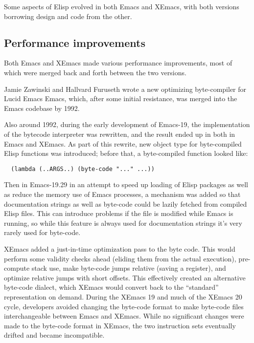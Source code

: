 \documentclass[format=acmsmall, review=false, screen=true]{acmart}
\newcommand \Elisp {Elisp}
\begin{document}
Some aspects of \Elisp{} evolved in both Emacs and XEmacs, with both
versions borrowing design and code from the other.

\subsection{Performance improvements}

Both Emacs and XEmacs made various performance improvements, most of
which were merged back and forth between the two versions.

Jamie Zawinski and Hallvard Furuseth wrote a new optimizing
byte-compiler for Lucid Emacs Emacs, which, after some initial resistance, was
merged into the Emacs codebase by 1992.

Also around 1992, during the early development of Emacs-19, the
implementation of the bytecode interpreter was rewritten, and the
result ended up in both in Emacs and XEmacs.
As part of this rewrite, new object type for byte-compiled \Elisp{}
functions was introduced; before that, a byte-compiled function looked
like:
%
\begin{verbatim}
  (lambda (..ARGS..) (byte-code "..." ...))
\end{verbatim}
%
Then in Emacs-19.29 in an attempt to speed up loading of \Elisp{} packages
as well as reduce the memory use of Emacs processes, a mechanism was added
so that documentation strings as well as byte-code could be lazily fetched
from compiled \Elisp{} files.  This can introduce problems if the file is
modified while Emacs is running, so while this feature is always used
for documentation strings it's very rarely used for byte-code.


XEmacs added a just-in-time optimization pass to the byte code.  This
would perform some validity checks ahead (eliding them from the actual
execution), pre-compute stack use, make byte-code jumps relative
(saving a register), and optimize relative jumps with short offsets.
This effectively created an alternative byte-code dialect, which
XEmacs would convert back to the ``standard'' representation on
demand.
During the XEmacs 19 and much of the XEmacs 20 cycle, developers
avoided changing the byte-code format to make byte-code files
interchangeable between Emacs and XEmacs.  While no significant
changes were made to the byte-code format in XEmacs, the two
instruction sets eventually drifted and became incompatible.
\end{document}
